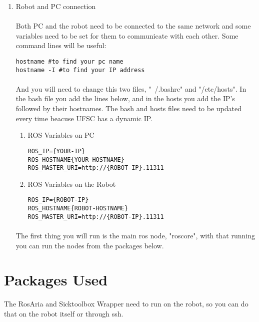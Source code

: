 \documentclass{article}
\begin{document}
\begin{enumerate}
\item Robot and PC connection
\paragraph{}
Both PC and the robot need to be connected to the same network and some variables
need to be set for them to communicate with each other. Some command lines will
be useful:
\begin{lstlisting}
hostname #to find your pc name
hostname -I #to find your IP address
\end{lstlisting}
\paragraph{}
And you will need to change this two files, "~/.bashrc" and "/etc/hosts".
In the bash file you add the lines below, and in the hosts you add the IP's
followed by their hostnames. The bash and hosts files need to be updated every
time beacuse UFSC has a dynamic IP.
\begin{enumerate}
\item ROS Variables on PC
\begin{lstlisting}
ROS_IP={YOUR-IP}
ROS_HOSTNAME{YOUR-HOSTNAME}
ROS_MASTER_URI=http://{ROBOT-IP}.11311
\end{lstlisting}
\item ROS Variables on the Robot
\begin{lstlisting}
ROS_IP={ROBOT-IP}
ROS_HOSTNAME{ROBOT-HOSTNAME}
ROS_MASTER_URI=http://{ROBOT-IP}.11311
\end{lstlisting}
\end{enumerate}
\paragraph{}
The first thing you will run is the main ros node, "roscore", with that running
you can run the nodes from the packages below.
\end{enumerate}

\section{Packages Used}
The RosAria and Sicktoolbox Wrapper need to run on the robot, so you can do that
on the robot itself or through ssh.
\end{document}
